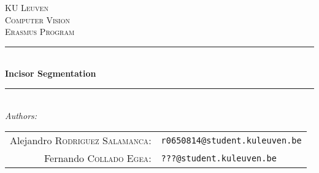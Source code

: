 \begin{titlepage}

\newcommand{\HRule}{\rule{\linewidth}{0.5mm}} %

\center %


\textsc{\LARGE KU Leuven}\\[3.5cm] %
\textsc{\Large Computer Vision}\\[0.5cm] %
\textsc{\large Erasmus Program}\\[2.5cm] %


\HRule \\[0.4cm]
{ \huge \bfseries Incisor Segmentation}\\[0.4cm] %
\HRule \\[5.5cm]



\emph{Authors:}\\[0.7cm]

\begin{tabular}{rl}
    Alejandro \textsc{Rodriguez Salamanca}: &\texttt{r0650814@student.kuleuven.be}\\
    Fernando \textsc{Collado Egea}: &\texttt{???@student.kuleuven.be}\\

\end{tabular}\\[2cm]




\end{titlepage}
